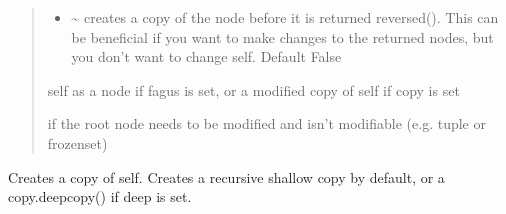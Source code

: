 \documentclass[a4paper,10pt,english]{sphinxmanual}
\begin{document}
\begin{fulllineitems}
\begin{fulllineitems}
\begin{quote}
\begin{description}
\begin{itemize}
\item {}
\sphinxAtStartPar
{} \textendash{} \textasciitilde{} creates a copy of the node before it is returned reversed(). This can be beneficial if you want to
make changes to the returned nodes, but you don’t want to change self. Default False

\end{itemize}

\sphinxAtStartPar
self as a node if fagus is set, or a modified copy of self if copy is set

\sphinxAtStartPar
{} \textendash{} if the root node needs to be modified and isn’t modifiable (e.g. tuple or frozenset)

\end{description}\end{quote}

\end{fulllineitems}


\begin{fulllineitems}
\label{\detokenize{fagus:fagus.Fagus.copy}}
\pysigstartsignatures
{}
\pysigstopsignatures
\sphinxAtStartPar
Creates a copy of self. Creates a recursive shallow copy by default, or a copy.deepcopy() if deep is set.

\end{fulllineitems}



\end{fulllineitems}
\end{document}
